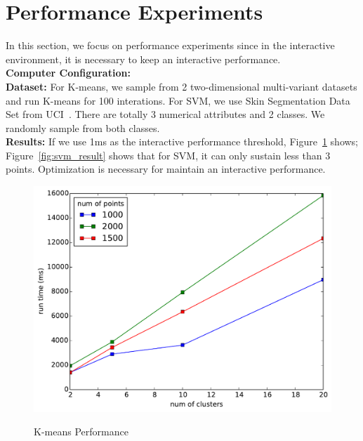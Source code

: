 \documentclass{article}
\begin{document}
\section{Performance Experiments}
In this section, we focus on performance experiments since in the interactive environment, it is necessary to keep an interactive performance. \\
\textbf{Computer Configuration:} \\
\textbf{Dataset:} For K-means, we sample from 2 two-dimensional multi-variant datasets and run K-means for 100 interations. For SVM, we use Skin Segmentation Data Set from UCI~\cite{skinsegment}.  There are totally 3 numerical attributes and 2 classes. We randomly sample from both classes. \\
\textbf{Results:} If we use 1ms as the interactive performance threshold, Figure~\ref{fig:kmeans_result} shows; Figure~\ref{fig:svm_result} shows that for SVM, it can only sustain less than 3 points. Optimization is necessary for maintain an interactive performance. \\
\begin{figure}[h]
		\includegraphics[width=\textwidth]{figs/kmeans_result}
		\label{fig:kmeans_result}
		\caption{K-means Performance}
\end{figure} 
\end{document}
